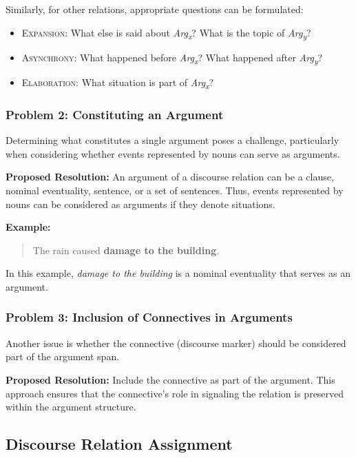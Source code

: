 \documentclass{udisc}
\begin{document}
\begin{itemize}
Similarly, for other relations, appropriate questions can be formulated:

\begin{itemize}
    \item \textsc{Expansion}: What else is said about \textit{Arg\textsubscript{x}}? What is the topic of \textit{Arg\textsubscript{y}}?
    \item \textsc{Asynchrony}: What happened before \textit{Arg\textsubscript{x}}? What happened after \textit{Arg\textsubscript{y}}?
    \item \textsc{Elaboration}: What situation is part of \textit{Arg\textsubscript{x}}?
\end{itemize}

\subsubsection{Problem 2: Constituting an Argument}

Determining what constitutes a single argument poses a challenge, particularly when considering whether events represented by nouns can serve as arguments.

\textbf{Proposed Resolution:} An argument of a discourse relation can be a clause, nominal eventuality, sentence, or a set of sentences. Thus, events represented by nouns can be considered as arguments if they denote situations.

\textbf{Example:}

\begin{quote}
The rain caused \textbf{damage to the building}.
\end{quote}

In this example, \textit{damage to the building} is a nominal eventuality that serves as an argument.

\subsubsection{Problem 3: Inclusion of Connectives in Arguments}

Another issue is whether the connective (discourse marker) should be considered part of the argument span.

\textbf{Proposed Resolution:} Include the connective as part of the argument. This approach ensures that the connective's role in signaling the relation is preserved within the argument structure.

\subsection{Discourse Relation Assignment}


\end{itemize}
\end{document}
